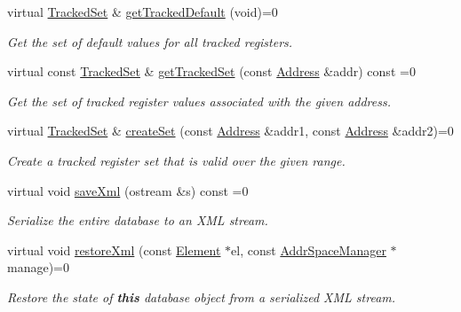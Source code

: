 \begin{DoxyCompactItemize}
virtual \mbox{\hyperlink{globalcontext_8hh_a7559d2c55c5d12fbbaf0418733b62438}{Tracked\+Set}} \& \mbox{\hyperlink{class_context_database_a08908cbaeb6c0a722e40f9392d9615bd}{get\+Tracked\+Default}} (void)=0
\begin{DoxyCompactList}\small\item\em Get the set of default values for all tracked registers. \end{DoxyCompactList}\item 
virtual const \mbox{\hyperlink{globalcontext_8hh_a7559d2c55c5d12fbbaf0418733b62438}{Tracked\+Set}} \& \mbox{\hyperlink{class_context_database_a6ea1e4b793286c0b1ecbafcc58422339}{get\+Tracked\+Set}} (const \mbox{\hyperlink{class_address}{Address}} \&addr) const =0
\begin{DoxyCompactList}\small\item\em Get the set of tracked register values associated with the given address. \end{DoxyCompactList}\item 
virtual \mbox{\hyperlink{globalcontext_8hh_a7559d2c55c5d12fbbaf0418733b62438}{Tracked\+Set}} \& \mbox{\hyperlink{class_context_database_aba61e2244e4c12105ed5b45a47720808}{create\+Set}} (const \mbox{\hyperlink{class_address}{Address}} \&addr1, const \mbox{\hyperlink{class_address}{Address}} \&addr2)=0
\begin{DoxyCompactList}\small\item\em Create a tracked register set that is valid over the given range. \end{DoxyCompactList}\item 
virtual void \mbox{\hyperlink{class_context_database_aaf116d099044b04dbcb6d83a079b1836}{save\+Xml}} (ostream \&s) const =0
\begin{DoxyCompactList}\small\item\em Serialize the entire database to an X\+ML stream. \end{DoxyCompactList}\item 
virtual void \mbox{\hyperlink{class_context_database_a779b5bcb5326d79e748a3dc9df0137d0}{restore\+Xml}} (const \mbox{\hyperlink{class_element}{Element}} $\ast$el, const \mbox{\hyperlink{class_addr_space_manager}{Addr\+Space\+Manager}} $\ast$manage)=0
\begin{DoxyCompactList}\small\item\em Restore the state of {\bfseries{this}} database object from a serialized X\+ML stream. \end{DoxyCompactList}\item 

\end{DoxyCompactItemize}
